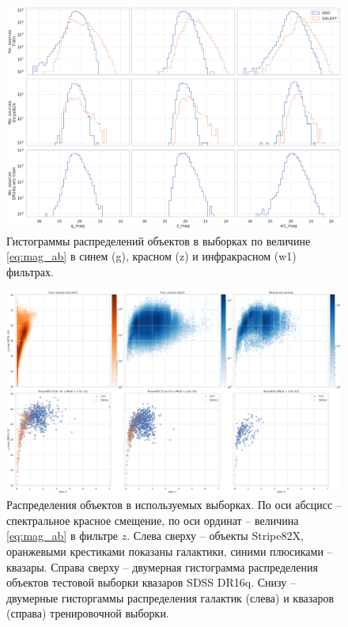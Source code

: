 \documentclass[fleqn,usenatbib]{mnras}
\begin{document}
\begin{figure}
    \centering
    \includegraphics[width=0.9\linewidth]{images/data-dist-mags-ab.png}
    \caption{Гистограммы распределений объектов в выборках по величине \eqref{eq:mag_ab} в синем (g), красном (z) и инфракрасном (w1) фильтрах.}
    \label{fig:my_label}
\end{figure}

\begin{figure}
    \centering
    \includegraphics[width=0.95\linewidth]{images/data-dist-ab.png}
    \caption{Распределения объектов в используемых выборках. По оси абсцисс -- спектральное красное смещение, по оси ординат -- величина \eqref{eq:mag_ab} в фильтре $z$. Слева сверху -- объекты Stripe82X, оранжевыми крестиками показаны галактики, синими плюсиками -- квазары. Справа сверху -- двумерная гистограмма распределения объектов тестовой выборки квазаров SDSS DR16q. Снизу -- двумерные гисторгаммы распределения галактик (слева) и квазаров (справа) тренировочной выборки.}
    \label{fig:data_distribution}
\end{figure}
\end{document}
